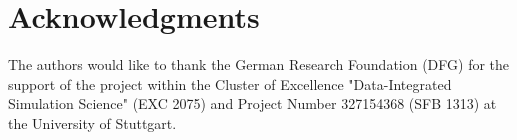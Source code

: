 \documentclass[a4paper,fleqn]{article}
\begin{document}
\section*{Acknowledgments}
The authors would like to thank the German Research Foundation (DFG) for the support of the project within the Cluster of Excellence "Data-Integrated Simulation Science" (EXC 2075) and Project Number 327154368 (SFB 1313) at the University of Stuttgart.





%
% 
% 
% 
% 
\end{document}
